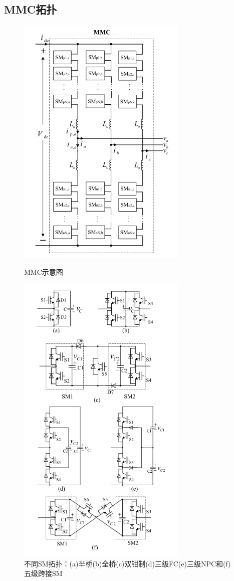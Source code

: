   \subsection{MMC拓扑}
  
\begin{figure}[h]
\begin{minipage}[t]{0.5\linewidth}
\centering
\includegraphics[width=3.2in]{images/Paper_Fig_1.png}
\setcaptionwidth{2.5in}
\caption{MMC示意图}
\end{minipage}%
\begin{minipage}[t]{0.5\linewidth}
\centering
\includegraphics[width=3.2in]{images/Paper_Fig_2.png}
\setcaptionwidth{2.5in}
\caption{ 不同SM拓扑：\quad(a)半桥\quad(b)全桥\quad(c)双钳制\quad(d)三级FC\quad(e)三级NPC和(f)五级跨接SM}
\end{minipage}
\end{figure}
  

